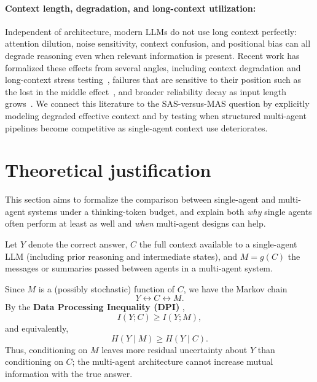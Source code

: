 \documentclass{article} %
\begin{document}
\paragraph{Context length, degradation, and long-context utilization:}
Independent of architecture, modern LLMs do not use long context perfectly: attention dilution, noise sensitivity, context confusion, and positional bias can all degrade reasoning even when relevant information is present. Recent work has formalized these effects from several angles, including context degradation and long-context stress testing~\citep{du2025context,li2025focusllm,lu2024controlled}, failures that are sensitive to their position such as the lost in the middle effect~\citep{liu2024lost}, and broader reliability decay as input length grows~\citep{hong2025contextrot}. We connect this literature to the SAS-versus-MAS question by explicitly modeling degraded effective context and by testing when structured multi-agent pipelines become competitive as single-agent context use deteriorates.

\section{Theoretical justification}
\label{sec:theory_justification}

This section aims to formalize the comparison between single-agent and multi-agent systems under a thinking-token budget, and explain both \emph{why} single agents often perform at least as well and \emph{when} multi-agent designs can help.

Let $Y$ denote the correct answer, $C$ the full context available to a single-agent LLM (including prior reasoning and intermediate states), and $M = g(C)$ the messages or summaries passed between agents in a multi-agent system.

Since $M$ is a (possibly stochastic) function of $C$, we have the Markov chain
\[
Y \longleftrightarrow C \longleftrightarrow M.
\]
By the \textbf{Data Processing Inequality (DPI)} \citep{CoverThomas2006},
\[
I(Y;C) \ge I(Y;M),
\]
and equivalently,
\[
H(Y \mid M) \ge H(Y \mid C).
\]
Thus, conditioning on $M$ leaves more residual uncertainty about $Y$ than conditioning on $C$; the multi-agent architecture cannot increase mutual information with the true answer.

\end{document}
